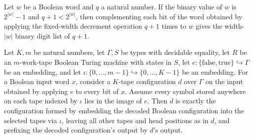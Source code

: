\begin{theorem}
\label{Turing.recordStep_saved_digits}
\leanok
{}
Let $w$ be a Boolean word and $q$ a natural number. If the binary value of $w$ is
$2^{|w|}-1$ and $q+1<2^{|w|}$, then complementing each bit of the word obtained by
applying the fixed-width decrement operation $q+1$ times to $w$ gives the width-$|w|$
binary digit list of $q+1$.
\end{theorem}

\begin{theorem}
\label{Turing.recordStep_restrict}
\leanok
{}
Let $K,m$ be natural numbers, let $\Gamma,S$ be types with decidable equality, let $R$
be an $m$-work-tape Boolean Turing machine with states in $S$, let
$e:\{\mathrm{false},\mathrm{true}\}\hookrightarrow\Gamma$ be an embedding, and let
$\iota:\{0,\ldots,m-1\}\hookrightarrow\{0,\ldots,K-1\}$ be an embedding. For a Boolean
input word $x$, consider a $K$-tape configuration $d$ over $\Gamma$ on the input
obtained by applying $e$ to every bit of $x$. Assume every symbol stored anywhere on
each tape indexed by $\iota$ lies in the image of $e$. Then $d$ is exactly the
configuration formed by embedding the decoded Boolean configuration into the selected
tapes via $\iota$, leaving all other tapes and head positions as in $d$, and prefixing
the decoded configuration's output by $d$'s output.
\end{theorem}

